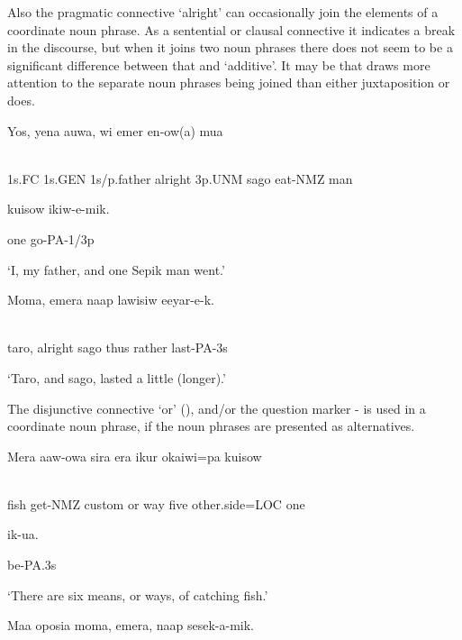 Also the pragmatic connective  `alright' can occasionally join the elements of a coordinate noun phrase. As a sentential or clausal connective it indicates a break in the discourse, but when it joins two noun phrases there does not seem to be a significant difference between that and  `additive'. It may be that  draws more attention to the separate noun phrases being joined than either juxtaposition or  does.

\ea%
\label{ex:x815}
\gll Yos,  yena  auwa,    wi  emer  en-ow(a)  mua  \\
      \\
\glt
\z

1s.FC  1s.GEN  1s/p.father  alright  3p.UNM  sago  eat-NMZ  man

kuisow  ikiw-e-mik.

one  go-PA-1/3p

`I, my father, and one Sepik man went.'

\ea%
\label{ex:x816}
\gll Moma,    emera  naap  lawisiw  eeyar-e-k. \\
      \\
\glt
\z

taro,  alright  sago  thus  rather  last-PA-3s

`Taro, and sago, lasted a little (longer).'

The disjunctive connective  `or' (), and/or the question marker -  is used in a coordinate noun phrase, if the noun phrases are presented as alternatives. 

\ea%
\label{ex:x817}
\gll Mera  aaw-owa  sira    era  ikur  okaiwi=pa  kuisow  \\
      \\
\glt
\z

fish  get-NMZ  custom  or  way  five  other.side=LOC  one  

ik-ua.

be-PA.3s

`There are six means, or ways, of catching fish.'

\ea%
\label{ex:x818}
\gll Maa  oposia moma,  emera,  naap  sesek-a-mik. \\
      \\
\glt
\z

